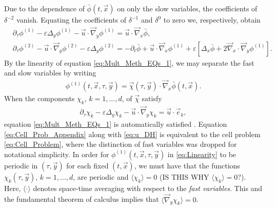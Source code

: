\documentclass[11pt]{amsart}
\begin{document}
Due to the dependence of $\bar{\phi}(t,\vec{x})$ on only the
slow variables, the coefficients of $\delta^{-2}$ vanish. Equating the
coefficients of $\delta^{-1}$ and $\delta^0$ to zero we, respectively, obtain 
%
\begin{align}
  \label{eq:Mult_Meth_EQs_1}
  &\partial_\tau\phi^{(1)}-\varepsilon\Delta_y\phi^{(1)}-\vec{u}\cdot\vec{\nabla}_y\phi^{(1)}=\vec{u}\cdot\vec{\nabla}_x\bar{\phi},
  \\
  \label{eq:Mult_Meth_EQs_2}
  &\partial_\tau\phi^{(2)}-\vec{u}\cdot\vec{\nabla}_y\phi^{(2)}-\varepsilon\Delta_y\phi^{(2)}
  =-\partial_t\bar{\phi}+\vec{u}\cdot\vec{\nabla}_x\phi^{(1)}+\varepsilon[\Delta_x\bar{\phi}+2\vec{\nabla}_x\cdot\vec{\nabla}_y\phi^{(1)}].
\end{align}
%
By the linearity of equation \eqref{eq:Mult_Meth_EQs_1}, we may
separate the fast and slow variables by writing
\cite{McLaughlin:SIAM_JAM:780}
%
\begin{align}\label{eq:Linearity}
  \phi^{(1)}(t,\vec{x},\tau,\vec{y})
    =%
    \vec{\chi}(\tau,\vec{y})\cdot\vec{\nabla}_x\bar{\phi}(t,\vec{x}).
\end{align}
%
When
the components $\chi_k$, $k=1,\ldots,d$, of $\vec{\chi}$ satisfy   
%
\begin{align}\label{eq:Cell_Prob_Appendix}
  \partial_\tau\chi_k-\varepsilon\Delta_y\chi_k-\vec{u}\cdot\vec{\nabla}_y\chi_k=\vec{u}\cdot\vec{e}_k,
\end{align}
%
equation \eqref{eq:Mult_Meth_EQs_1} is automatically satisfied
\cite{McLaughlin:SIAM_JAM:780}. Equation \eqref{eq:Cell_Prob_Appendix}
along with \eqref{eq:u_DH} is equivalent to the cell problem
\eqref{eq:Cell_Problem}, where the distinction of fast variables was
dropped for notational simplicity. In order for
$\phi^{(1)}(t,\vec{x},\tau,\vec{y})$ in \eqref{eq:Linearity} to be periodic  
in $(\tau,\vec{y})$ for each fixed $(t,\vec{x})$, we must have that the
functions $\chi_k(\tau,\vec{y})$, $k=1,\ldots,d$, are periodic and
$\langle\chi_k\rangle=0$ (IS THIS WHY $\langle\chi_k\rangle=0$?). Here, $\langle\cdot\rangle$ denotes space-time
averaging with respect to the \emph{fast variables}. This and the
fundamental theorem of calculus implies that $\langle\vec{\nabla}_y\chi_k\rangle=0$. 
\end{document}
